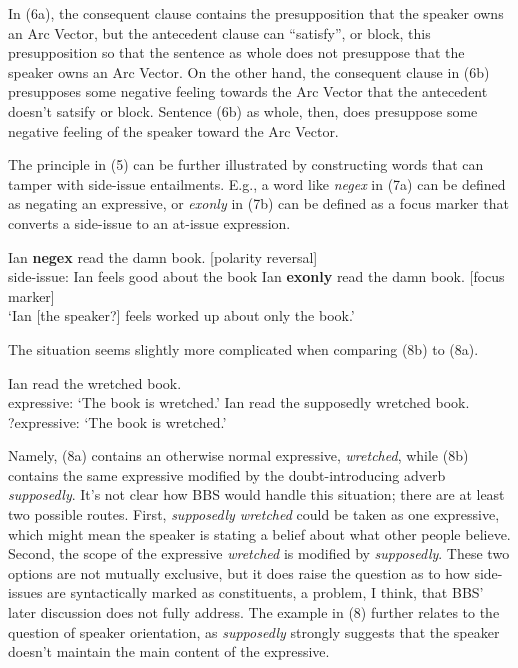 \documentclass[12pt]{article}
\begin{document}
In (6a), the consequent clause contains the presupposition that the speaker owns an Arc Vector, but the antecedent clause can ``satisfy'', or block, this presupposition so that the sentence as whole does not presuppose that the speaker owns an Arc Vector. On the other hand, the consequent clause in (6b) presupposes some negative feeling towards the Arc Vector that the antecedent doesn't satsify or block. Sentence (6b) as whole, then, does presuppose some negative feeling of the speaker toward the Arc Vector.

The principle in (5) can be further illustrated by constructing words that can tamper with side-issue entailments. E.g., a word like \textit{negex} in (7a) can be defined as negating an expressive, or \textit{exonly} in (7b) can be defined as a focus marker that converts a side-issue to an at-issue expression.

\pex
\a Ian \textbf{negex} read the damn book. \hfill [polarity reversal] \\ side-issue: Ian feels good about the book
\a Ian \textbf{exonly} read the damn book. \hfill [focus marker] \\ `Ian [the speaker?] feels worked up about only the book.'
\xe

The situation seems slightly more complicated when comparing (8b) to (8a). 

\pex
\a Ian read the wretched book. \\ expressive: `The book is wretched.'
\a Ian read the supposedly wretched book. \\ ?expressive: `The book is wretched.'
\xe

\noindent Namely, (8a) contains an otherwise normal expressive, \textit{wretched}, while (8b) contains the same expressive modified by the doubt-introducing adverb \textit{supposedly}. It's not clear how BBS would handle this situation; there are at least two possible routes. First, \textit{supposedly wretched} could be taken as one expressive, which might mean the speaker is stating a belief about what other people believe. Second, the scope of the expressive \textit{wretched} is modified by \textit{supposedly}. These two options are not mutually exclusive, but it does raise the question as to how side-issues are syntactically marked as constituents, a problem, I think, that BBS' later discussion does not fully address. The example in (8) further relates to the question of speaker orientation, as \textit{supposedly} strongly suggests that the speaker doesn't maintain the main content of the expressive.
\end{document}
